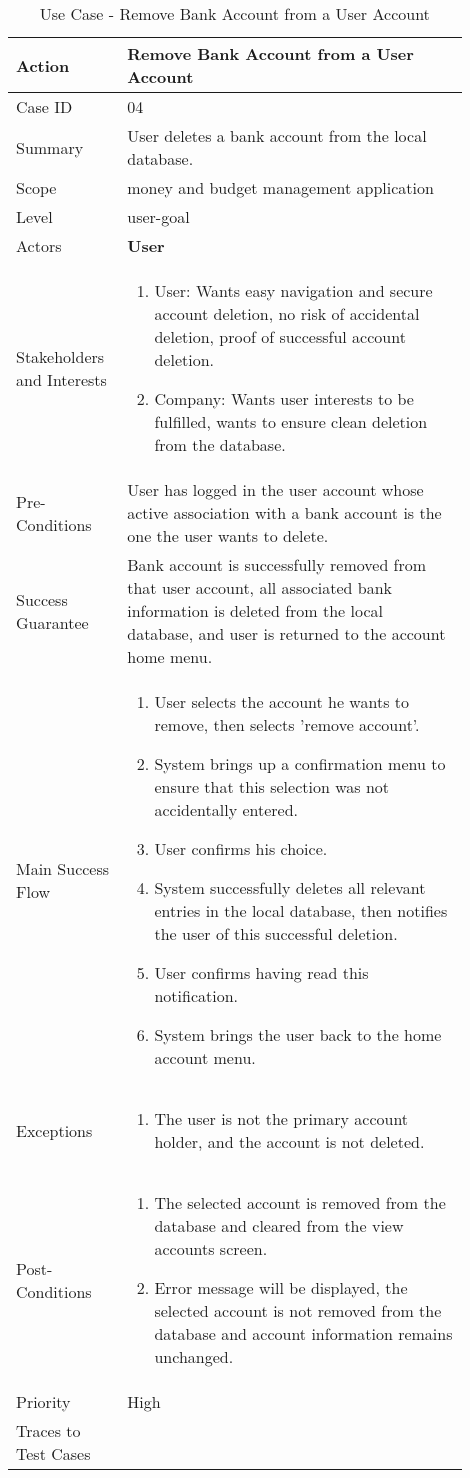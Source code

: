 \documentclass[11pt]{article}
\newcounter{use case ID}
\newcommand\tabularhead[1]{
    \begin{table}[ht]
        \addtocounter{use case ID}{1}
        \caption{Use Case \arabic{use case ID} - #1}
        \vspace{0.2cm}
        \begin{tabular}{|p{0.2\linewidth}|p{0.70\linewidth}|}
            \hline
            \textbf{Action} & \textbf{#1} \\
            \hline}
\newcommand\addrow[2]{#1 & #2\\ \hline}
\newcommand\addmulrow[2]{ \begin{minipage}[t][][t]{2.5cm}#1\end{minipage}
                &\begin{minipage}[t][][t]{11cm}
                    \begin{enumerate}[itemsep=-1ex] #2   \end{enumerate}
                \end{minipage}\vfill\\ \hline}
\newenvironment{usecase}{\tabularhead}
        {\hline\end{tabular}\end{table}}
\begin{document}
\begin{usecase}{Remove Bank Account from a User Account}
    \addrow{Case ID}{04}
    \addrow{Summary}{User deletes a bank account from the local database.}
     \addrow{Scope}{money and budget management application}
     \addrow{Level}{user-goal}
     \addrow{Actors}{\textbf{User}}
     \addmulrow{Stakeholders and Interests}{
     \item User: Wants easy navigation and secure account deletion, no risk of accidental deletion, proof of successful account deletion.
     \item Company: Wants user interests to be fulfilled, wants to ensure clean deletion from the database. }
     \addrow{Pre-Conditions}{User has logged in the user account whose active association with a bank account is the one the user wants to delete.}
     \addrow{Success Guarantee}{Bank account is successfully removed from that user account, all associated bank information is deleted from the local database, and user is returned to the account home menu.}
     \addmulrow{Main Success Flow}{
     \item User selects the account he wants to remove, then selects 'remove account'.
     \item System brings up a confirmation menu to ensure that this selection was not accidentally entered.
     \item User confirms his choice.
     \item System successfully deletes all relevant entries in the local database, then notifies the user of this successful deletion.
     \item User confirms having read this notification.
     \item System brings the user back to the home account menu.}
     \addmulrow{Exceptions}{
     \item The user is not the primary account holder, and the account is not deleted.
     }
     \addmulrow{Post-Conditions}{
     \item The selected account is removed from the database and cleared from the view accounts screen.
     \item Error message will be displayed, the selected account is not removed from the database and account information remains unchanged.
     }
     \addrow{Priority}{High}
     \addrow{Traces to Test Cases}{}
\end{usecase}
\end{document}
